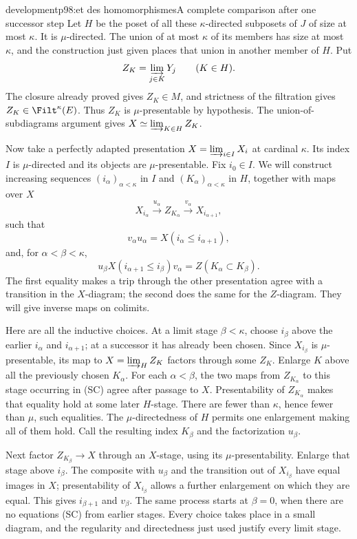 \begin{dcomment}{development}{p98:et des homomorphismes}{A complete comparison after one successor step}
Let $H$ be the poset of all these $\kappa$-directed subposets of $J$ of size at most $\kappa$. It is $\mu$-directed. The union of at most $\kappa$ of its members has size at most $\kappa$, and the construction just given places that union in another member of $H$. Put
\[
 Z_K=\varinjlim_{j\in K}Y_j\qquad(K\in H).
\]
The closure already proved gives $Z_K\in M$, and strictness of the filtration gives $Z_K\in\Filt^\kappa(E)$. Thus $Z_K$ is $\mu$-presentable by hypothesis. The union-of-subdiagrams argument gives $X\simeq\varinjlim_{K\in H}Z_K$.

Now take a perfectly adapted presentation $X=\varinjlim_{i\in I}X_i$ at cardinal $\kappa$. Its index $I$ is $\mu$-directed and its objects are $\mu$-presentable. Fix $i_0\in I$. We will construct increasing sequences $(i_\alpha)_{\alpha<\kappa}$ in $I$ and $(K_\alpha)_{\alpha<\kappa}$ in $H$, together with maps over $X$
\[
 X_{i_\alpha}\xrightarrow{u_\alpha}Z_{K_\alpha}
       \xrightarrow{v_\alpha}X_{i_{\alpha+1}},
\]
such that
\[
 v_\alpha u_\alpha=X(i_\alpha\leq i_{\alpha+1}),
\]
and, for $\alpha<\beta<\kappa$,
\[
 u_\beta X(i_{\alpha+1}\leq i_\beta)v_\alpha
       =Z(K_\alpha\subset K_\beta).                 \tag{SC}
\]
The first equality makes a trip through the other presentation agree with a transition in the $X$-diagram; the second does the same for the $Z$-diagram. They will give inverse maps on colimits.

Here are all the inductive choices. At a limit stage $\beta<\kappa$, choose $i_\beta$ above the earlier $i_\alpha$ and $i_{\alpha+1}$; at a successor it has already been chosen. Since $X_{i_\beta}$ is $\mu$-presentable, its map to $X=\varinjlim_H Z_K$ factors through some $Z_K$. Enlarge $K$ above all the previously chosen $K_\alpha$. For each $\alpha<\beta$, the two maps from $Z_{K_\alpha}$ to this stage occurring in (SC) agree after passage to $X$. Presentability of $Z_{K_\alpha}$ makes that equality hold at some later $H$-stage. There are fewer than $\kappa$, hence fewer than $\mu$, such equalities. The $\mu$-directedness of $H$ permits one enlargement making all of them hold. Call the resulting index $K_\beta$ and the factorization $u_\beta$.

Next factor $Z_{K_\beta}\to X$ through an $X$-stage, using its $\mu$-presentability. Enlarge that stage above $i_\beta$. The composite with $u_\beta$ and the transition out of $X_{i_\beta}$ have equal images in $X$; presentability of $X_{i_\beta}$ allows a further enlargement on which they are equal. This gives $i_{\beta+1}$ and $v_\beta$. The same process starts at $\beta=0$, when there are no equations (SC) from earlier stages. Every choice takes place in a small diagram, and the regularity and directedness just used justify every limit stage.


\end{dcomment}
